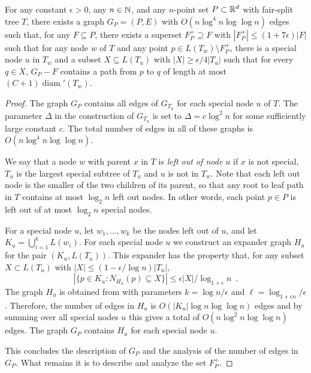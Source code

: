 \documentclass{patmorin}
\DeclareMathOperator{\diam}{diam}
\begin{document}
\begin{lem}
  For any constant $\epsilon >0$, any $n\in\mathbb{N}$, and any $n$-point
  set $P\subset\mathbb{R}^d$ with fair-split tree $T$, there exists a graph
  $G_P=(P,E)$ with $O(n\log^4 n\log\log n)$ edges such that, for any 
  $F\subseteq
  P$, there exists a superset $F^+_P\supseteq F$ with $|F^+_P|\le
  (1+7\epsilon)|F|$ such that for any node $w$ of $T$ and any point
  $p\in L(T_w)\setminus F^+_P$, there is a special node $u$ in $T_w$
  and a subset $X\subseteq L(T_u)$
  with $|X|\ge \epsilon/4|T_u|$ such that for every $q\in X$, $G_P-F$
  contains a path from $p$ to $q$ of length at most $(C+1)\diam'(T_w)$.
\end{lem}


\begin{proof}
  The graph $G_P$ contains all edges of $G_{T_u}$ for each special node
  $u$ of $T$.  The parameter $\Delta$ in the construction of $G_{T_u}$
  is set to $\Delta=c\log^2 n$ for some sufficiently large constant $c$.
  The total number of edges in all of these graphs is $O(n\log^4
  n\log\log n)$.  

  We say that a node $w$ with parent $x$ in $T$ is \emph{left out of
  node $u$} if $x$ is not special, $T_u$ is the largest special subtree
  of $T_x$ and $u$ is not in $T_w$. Note that each left out node is the
  smaller of the two children of its parent, so that any root to leaf
  path in $T$ contains at most $\log_2 n$ left out nodes.  In other words,
  each point $p\in P$ is left out of at most $\log_2 n$ special nodes.
	
  For a special node $u$, let $w_1,\ldots,w_k$ be the nodes left out of $u$, and  let $K_u=\bigcup_{i=1}^k L(w_i)$.  For each special node $u$ we construct
  an expander graph $H_u$ for the pair
  $(K_u,L(T_u))$. This expander has the property that, for any
  subset $X\subset L(T_u)$ with $|X|\le (1-\epsilon/\log n)|T_u|$, 
  \[ |\{p\in K_u: N_{H_u}(p)\subseteq X\}| \le \epsilon|X|/\log_{1+\epsilon} n \enspace . \] 
  The graph $H_u$ is obtained from  with parameters
  $k=\log n/\epsilon$ and $\ell=\log_{1+\epsilon n}/\epsilon$.  Therefore,
  the number of edges in $H_u$ is $O(|K_u|\log n\log\log n)$ edges and
  by summing over all special nodes $u$ this gives a total of $O(n\log^2
  n\log\log n)$ edges.  The graph $G_P$ contains $H_u$ for each special
  node $u$.

  This concludes the description of $G_P$ and the analysis of the number
  of edges in $G_P$. What remains it is to describe and analyze the
  set $F^+_P$.



\end{proof}
\end{document}
